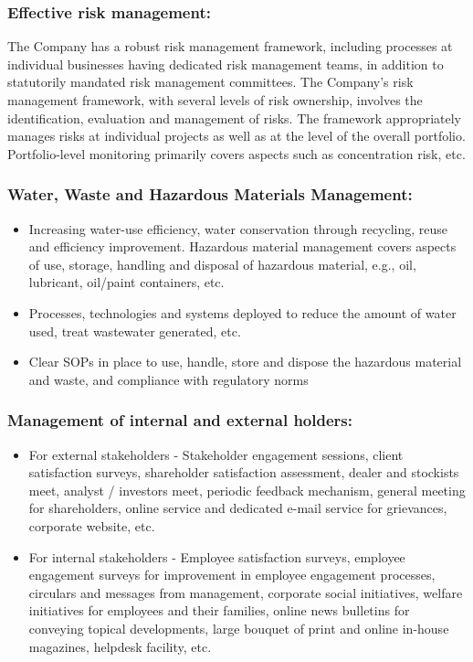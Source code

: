     \subsubsection {\textbf{Effective risk management:}} The Company has a robust risk management framework, including processes at individual businesses having dedicated risk management teams, in addition to statutorily mandated risk management committees. The Company's risk management framework, with several levels of risk ownership, involves the identification, evaluation and management of risks. The framework appropriately manages risks at individual projects as well as at the level of the overall portfolio. Portfolio-level monitoring primarily covers aspects such as concentration risk, etc.
    \subsubsection {\textbf{Water, Waste and Hazardous Materials Management:
        }}\begin{itemize}
            \item 
         Increasing water-use efficiency, water conservation through recycling, reuse and efficiency improvement. Hazardous material management covers aspects of use, storage, handling and disposal of hazardous material, e.g., oil, lubricant, oil/paint containers, etc. \item Processes, technologies and systems deployed to reduce the amount of water used, treat wastewater generated, etc. \item Clear SOPs in place to use, handle, store and dispose the hazardous material and waste, and compliance with regulatory norms
        \end{itemize}
        \subsubsection {\textbf{Management of internal and external holders:}}
        \begin{itemize}
            \item For external stakeholders - Stakeholder
            engagement sessions, client satisfaction surveys, shareholder satisfaction assessment, 
            dealer and stockists meet, analyst / investors meet, periodic feedback mechanism, general 
            meeting for shareholders, online service and dedicated e-mail service for grievances, 
            corporate website, etc. 
            \item  For internal stakeholders - Employee
            satisfaction surveys, employee engagement surveys for improvement in employee
            engagement processes, circulars and messages from management, corporate 
            social initiatives, welfare initiatives for employees and their families, online news 
            bulletins for conveying topical developments, large bouquet of print and online in-house 
            magazines, helpdesk facility, etc. 
                        
        \end{itemize}

